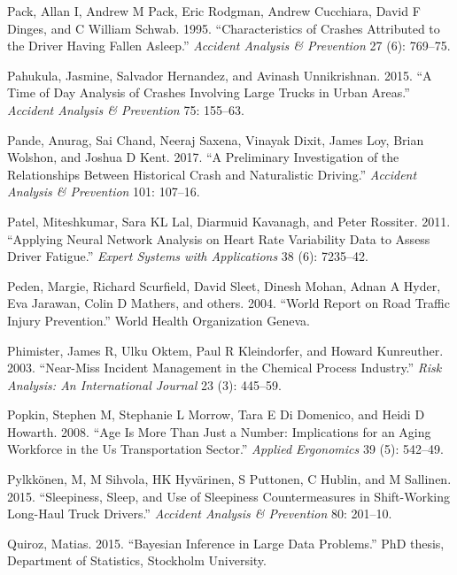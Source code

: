 \documentclass[12pt]{book}
\numberwithin{equation}{chapter}
\begin{document}
\leavevmode\hypertarget{ref-pack1995characteristics}{}%
Pack, Allan I, Andrew M Pack, Eric Rodgman, Andrew Cucchiara, David F Dinges, and C William Schwab. 1995. ``Characteristics of Crashes Attributed to the Driver Having Fallen Asleep.'' \emph{Accident Analysis \& Prevention} 27 (6): 769--75.

\leavevmode\hypertarget{ref-pahukula2015time}{}%
Pahukula, Jasmine, Salvador Hernandez, and Avinash Unnikrishnan. 2015. ``A Time of Day Analysis of Crashes Involving Large Trucks in Urban Areas.'' \emph{Accident Analysis \& Prevention} 75: 155--63.

\leavevmode\hypertarget{ref-pande2017preliminary}{}%
Pande, Anurag, Sai Chand, Neeraj Saxena, Vinayak Dixit, James Loy, Brian Wolshon, and Joshua D Kent. 2017. ``A Preliminary Investigation of the Relationships Between Historical Crash and Naturalistic Driving.'' \emph{Accident Analysis \& Prevention} 101: 107--16.

\leavevmode\hypertarget{ref-patel2011applying}{}%
Patel, Miteshkumar, Sara KL Lal, Diarmuid Kavanagh, and Peter Rossiter. 2011. ``Applying Neural Network Analysis on Heart Rate Variability Data to Assess Driver Fatigue.'' \emph{Expert Systems with Applications} 38 (6): 7235--42.

\leavevmode\hypertarget{ref-peden2004world}{}%
Peden, Margie, Richard Scurfield, David Sleet, Dinesh Mohan, Adnan A Hyder, Eva Jarawan, Colin D Mathers, and others. 2004. ``World Report on Road Traffic Injury Prevention.'' World Health Organization Geneva.

\leavevmode\hypertarget{ref-phimister2003near}{}%
Phimister, James R, Ulku Oktem, Paul R Kleindorfer, and Howard Kunreuther. 2003. ``Near-Miss Incident Management in the Chemical Process Industry.'' \emph{Risk Analysis: An International Journal} 23 (3): 445--59.

\leavevmode\hypertarget{ref-popkin2008age}{}%
Popkin, Stephen M, Stephanie L Morrow, Tara E Di Domenico, and Heidi D Howarth. 2008. ``Age Is More Than Just a Number: Implications for an Aging Workforce in the Us Transportation Sector.'' \emph{Applied Ergonomics} 39 (5): 542--49.

\leavevmode\hypertarget{ref-pylkkonen2015sleepiness}{}%
Pylkkönen, M, M Sihvola, HK Hyvärinen, S Puttonen, C Hublin, and M Sallinen. 2015. ``Sleepiness, Sleep, and Use of Sleepiness Countermeasures in Shift-Working Long-Haul Truck Drivers.'' \emph{Accident Analysis \& Prevention} 80: 201--10.

\leavevmode\hypertarget{ref-quiroz2015bayesian}{}%
Quiroz, Matias. 2015. ``Bayesian Inference in Large Data Problems.'' PhD thesis, Department of Statistics, Stockholm University.
\end{document}
